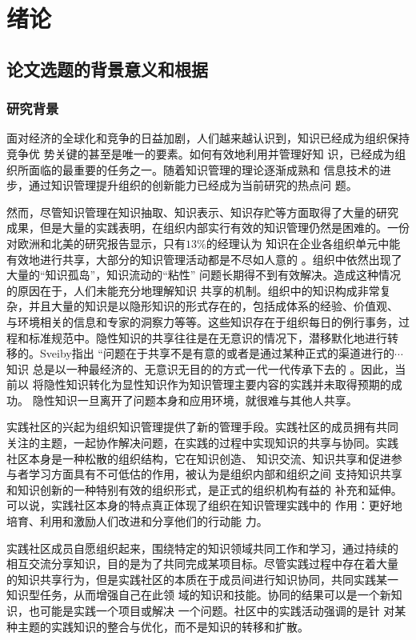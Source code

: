 \chapter{绪论}
  \section{论文选题的背景意义和根据}

  \subsection{研究背景}

  
面对经济的全球化和竞争的日益加剧，人们越来越认识到，知识已经成为组织保持竞争优
势关键的甚至是唯一的要素\cite{Drucker1995}。如何有效地利用并管理好知
识，已经成为组织所面临的最重要的任务之一。随着知识管理的理论逐渐成熟和
信息技术的进步，通过知识管理提升组织的创新能力已经成为当前研究的热点问
题。

然而，尽管知识管理在知识抽取、知识表示、知识存贮等方面取得了大量的研究
成果，但是大量的实践表明，在组织内部实行有效的知识管理仍然是困难的。一份对欧洲和北美的研究报告显示，只有$13\%$的经理认为
知识在企业各组织单元中能有效地进行共享，大部分的知识管理活动都是不尽如人意的
\cite{Ruggles1998}。组织中依然出现了大量的“知识孤岛”，知识流动的“粘性”\cite{szulanski2000pkt}
问题长期得不到有效解决。造成这种情况的原因在于，人们未能充分地理解知识
共享的机制。组织中的知识构成非常复
杂，并且大量的知识是以隐形知识的形式存在的，包括成体系的经验、价值观、
与环境相关的信息和专家的洞察力等等。这些知识存在于组织每日的例行事务，过
程和标准规范中。隐性知识的共享往往是在无意识的情况下，潜移默化地进行转
移的。Sveiby指出
“问题在于共享不是有意的或者是通过某种正式的渠道进行的$\cdots$ 知识
总是以一种最经济的、无意识无目的的方式一代一代传承下去的
\cite{sveiby1996tka}。因此，当前以
将隐性知识转化为显性知识作为知识管理主要内容的实践并未取得预期的成功。
隐性知识一旦离开了问题本身和应用环境，就很难与其他人共享。

实践社区的兴起为组织知识管理提供了新的管理手段。实践社区的成员拥有共同
关注的主题，一起协作解决问题，在实践的过程中实现知识的共享与协同。实践
社区本身是一种松散的组织结构，它在知识创造、
知识交流、知识共享和促进参与者学习方面具有不可低估的作用，被认为是组织内部和组织之间
支持知识共享和知识创新的一种特别有效的组织形式，是正式的组织机构有益的
补充和延伸。可以说，实践社区本身的特点真正体现了组织在知识管理实践中的
作用：更好地培育、利用和激励人们改进和分享他们的行动能
力\cite{Seviby1997}。

实践社区成员自愿组织起来，围绕特定的知识领域共同工作和学习，通过持续的
相互交流分享知识，目的是为了共同完成某项目标。尽管实践过程中存在着大量
的知识共享行为，但是实践社区的本质在于成员间进行知识协同，共同实践某一
知识型任务，从而增强自己在此领
域的知识和技能。协同的结果可以是一个新知识，也可能是实践一个项目或解决
一个问题。社区中的实践活动强调的是针
对某种主题的实践知识的整合与优化，而不是知识的转移和扩散。

